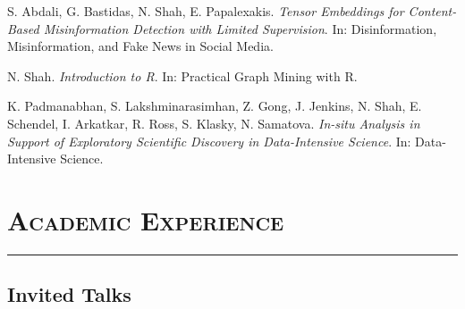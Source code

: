 \documentclass{article}
\newcommand{\HRule}{\rule{\linewidth}{0.5mm}}
\begin{document}
\begin{etaremune}[itemsep=1pt,parsep=0pt]
\item S. Abdali, G. Bastidas, N. Shah, E. Papalexakis. \emph{Tensor Embeddings for Content-Based Misinformation Detection with Limited Supervision}. In: Disinformation, Misinformation, and Fake News in Social Media.
\item N. Shah. \emph{Introduction to R}. In: Practical Graph Mining with R.
\item K. Padmanabhan, S. Lakshminarasimhan, Z. Gong, J. Jenkins, N. Shah, E. Schendel, I. Arkatkar, R. Ross, S. Klasky, N. Samatova. \emph{In-situ Analysis in Support of Exploratory Scientific Discovery in Data-Intensive Science}. In: Data-Intensive Science.
\end{etaremune}

\section*{\bf \textsc{Academic Experience}}

\vspace{-5mm}\HRule

\subsection*{\bf {Invited Talks}}
\end{document}
